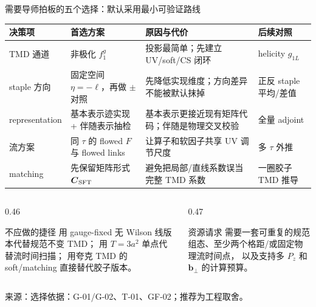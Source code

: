 \documentclass[UTF8,aspectratio=169,11pt]{ctexbeamer}
\newcommand{\source}[1]{%
  \par\vspace{0.05em}%
  {\raggedright\scriptsize\color{muted}来源：#1\par}}
\begin{document}
\begin{frame}[t]{需要导师拍板的五个选择：默认采用最小可验证路线}
  \scriptsize
  \begin{tabularx}{\textwidth}{@{}>{\raggedright\arraybackslash}p{2.0cm}>{\raggedright\arraybackslash}p{3.0cm}>{\raggedright\arraybackslash}X>{\raggedright\arraybackslash}p{2.1cm}@{}}
    \toprule
    决策项 & 首选方案 & 原因与代价 & 后续对照 \\
    \midrule
    TMD 通道 & 非极化 $f_1^g$ & 投影最简单；先建立 UV/soft/CS 闭环 & helicity $g_{1L}$ \\
    staple 方向 & 固定空间 $\eta=-\ell$，再做 $\pm$ 对照 & 先降低实现维度；方向差异不能被默认抹掉 & 正反 staple 平均/差值 \\
    representation & 基本表示迹实现 + 伴随表示抽检 & 基本表示更接近现有矩阵代码；伴随是物理交叉校验 & 全量 adjoint \\
    流方案 & 同 $\tau$ 的 flowed $F$ 与 flowed links & 让算子和软因子共享 UV 调节尺度 & 多 $\tau$ 外推 \\
    matching & 先保留矩阵形式 $\boldsymbol C_{\rm SFT}$ & 避免把局部/直线系数误当完整 TMD 系数 & 一圈胶子 TMD 推导 \\
    \bottomrule
  \end{tabularx}
  \vfill
  \begin{columns}[T,totalwidth=\textwidth]
    \begin{column}{0.46\textwidth}
      \begin{block}{不应做的捷径}
        用 gauge-fixed 无 Wilson 线版本代替规范不变 TMD；
        用 $T=3a^2$ 单点代替流时间扫描；
        用夸克 TMD 的 soft/matching 直接替代胶子版本。
      \end{block}
    \end{column}
    \begin{column}{0.47\textwidth}
      \begin{block}{资源请求}
        需要一套可重复的规范组态、至少两个格距/或固定物理流时间点，
        以及支持多 $P_z$ 和 $\boldsymbol b_\perp$ 的计算预算。
      \end{block}
    \end{column}
  \end{columns}
  \source{选择依据：G-01/G-02、T-01、GF-02；推荐为工程取舍。}
\end{frame}
\end{document}
